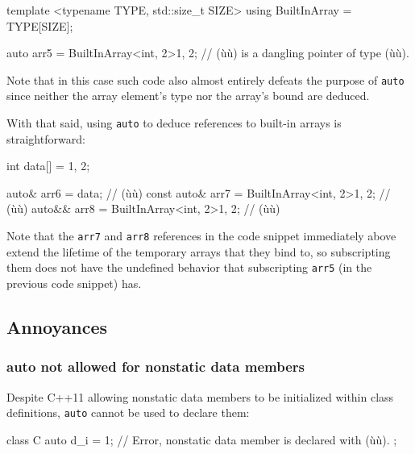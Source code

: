 \begin{emcppslisting}[language=C++]
template <typename TYPE, std::size_t SIZE>
using BuiltInArray = TYPE[SIZE];

auto arr5 = BuiltInArray<int, 2>{1, 2};
    // (ù{}ù) is a dangling pointer of type (ù{}ù).
\end{emcppslisting}
    
\noindent Note that in this case such code also almost entirely defeats the
purpose of \lstinline!auto! since neither the array element's type nor the
array's bound are deduced.

With that said, using \lstinline!auto! to deduce
references to built-in arrays is straightforward:

\begin{emcppslisting}[language=C++]
int data[] = {1, 2};

      auto&  arr6 = data;                        //       (ù{}ù)
const auto&  arr7 = BuiltInArray<int, 2>{1, 2};  // (ù{}ù)
      auto&& arr8 = BuiltInArray<int, 2>{1, 2};  //       (ù{}ù)
\end{emcppslisting}
    
\noindent Note that the \lstinline!arr7! and \lstinline!arr8! references in the code snippet immediately above extend
the lifetime of the temporary arrays that they bind to, so subscripting
them does not have the undefined behavior that subscripting
\lstinline!arr5! (in the previous code snippet) has.

\subsection[Annoyances]{Annoyances}\label{annoyances-auto}

\subsubsection[\lstinline!auto! not allowed for nonstatic data members]{{\SubsubsecCode auto} not allowed for nonstatic data members}\label{auto-not-allowed-for-non-static-data-members}

Despite C++11 allowing nonstatic data members to be initialized within
class definitions, \lstinline!auto! cannot be used to declare them:

\begin{emcppslisting}[language=C++]
class C
{
    auto d_i = 1;  // Error, nonstatic data member is declared with (ù{}ù).
};
\end{emcppslisting}
    

